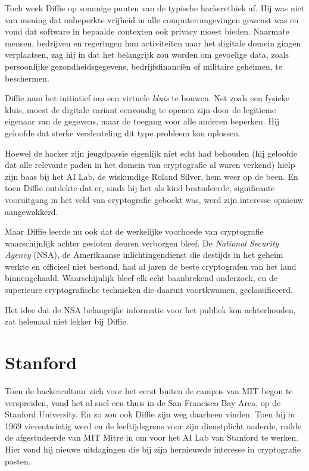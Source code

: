 \documentclass[
  a5paper,
  smalldemyvopaper,11pt,twoside,onecolumn,openright,extrafontsizes,
hidelinks]{memoir}
\begin{document}
Toch week Diffie op sommige punten van de typische hackerethiek af. Hij
was niet van mening dat onbeperkte vrijheid in alle computeromgevingen
gewenst was en vond dat software in bepaalde contexten ook privacy moest
bieden. Naarmate mensen, bedrijven en regeringen hun activiteiten naar
het digitale domein gingen verplaatsen, zag hij in dat het belangrijk
zou worden om gevoelige data, zoals persoonlijke gezondheidsgegevens,
bedrijfsfinanciën of militaire geheimen, te beschermen.

Diffie nam het initiatief om een virtuele \emph{kluis} te bouwen. Net
zoals een fysieke kluis, moest de digitale variant eenvoudig te openen
zijn door de legitieme eigenaar van de gegevens, maar de toegang voor
alle anderen beperken. Hij geloofde dat sterke versleuteling dit type
probleem kon oplossen.

Hoewel de hacker zijn jeugdpassie eigenlijk niet echt had behouden (hij
geloofde dat alle relevante paden in het domein van cryptografie al
waren verkend) hielp zijn baas bij het AI Lab, de wiskundige Roland
Silver, hem weer op de been. En toen Diffie ontdekte dat er, sinds hij
het als kind bestudeerde, significante vooruitgang in het veld van
cryptografie geboekt was, werd zijn interesse opnieuw aangewakkerd.

Maar Diffie leerde nu ook dat de werkelijke voorhoede van cryptografie
waarschijnlijk achter gesloten deuren verborgen bleef. De \emph{National
Security Agency} (NSA), de Amerikaanse inlichtingendienst die destijds
in het geheim werkte en officieel niet bestond, had al jaren de beste
cryptografen van het land binnengehaald. Waarschijnlijk bleef elk echt
baanbrekend onderzoek, en de superieure cryptografische technieken die
daaruit voortkwamen, geclassificeerd.

Het idee dat de NSA belangrijke informatie voor het publiek kon
achterhouden, zat helemaal niet lekker bij Diffie.

\section{Stanford}\label{stanford}

Toen de hackercultuur zich voor het eerst buiten de campus van MIT begon
te verspreiden, vond het al snel een thuis in de San Francisco Bay Area,
op de Stanford University. En zo zou ook Diffie zijn weg daarheen
vinden. Toen hij in 1969 vierentwintig werd en de leeftijdsgrens voor
zijn dienstplicht naderde, ruilde de afgestudeerde van MIT Mitre in om
voor het AI Lab van Stanford te werken. Hier vond hij nieuwe uitdagingen
die bij zijn hernieuwde interesse in cryptografie pasten.
\end{document}
